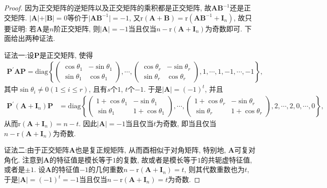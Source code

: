 \documentclass[../../main.tex]{subfiles}%
\begin{document}
\begin{proof}

因为正交矩阵的逆矩阵以及正交矩阵的乘积都是正交矩阵, 故\(\boldsymbol{AB}^{-1}\)还是正交矩阵. \(\vert\boldsymbol{A}\vert+\vert\boldsymbol{B}\vert = 0\)等价于\(\vert\boldsymbol{AB}^{-1}\vert = -1\), 又\(\mathrm{r}(\boldsymbol{A}+\boldsymbol{B})=\mathrm{r}(\boldsymbol{AB}^{-1}+\boldsymbol{I}_{n})\), 故只要证明: 若\(\boldsymbol{A}\)是\(n\)阶正交矩阵, 则\(\vert\boldsymbol{A}\vert = -1\)当且仅当\(n-\mathrm{r}(\boldsymbol{A}+\boldsymbol{I}_{n})\)为奇数即可. 下面给出两种证法.

{\color{blue}证法一:}设\(\boldsymbol{P}\)是正交矩阵, 使得
\begin{align*}
\boldsymbol{P}^{\prime}\boldsymbol{AP}=\mathrm{diag}\left\{\begin{pmatrix}\cos\theta_{1}&-\sin\theta_{1}\\\sin\theta_{1}&\cos\theta_{1}\end{pmatrix},\cdots,\begin{pmatrix}\cos\theta_{r}&-\sin\theta_{r}\\\sin\theta_{r}&\cos\theta_{r}\end{pmatrix},1,\cdots,1, -1,\cdots,-1\right\},
\end{align*}
其中\(\sin\theta_{i}\neq 0(1\leqslant  i\leqslant  r)\), 且有\(s\)个\(1\), \(t\)个\(-1\). 于是\(\vert\boldsymbol{A}\vert = (-1)^{t}\), 并且
\begin{align*}
\boldsymbol{P}^{\prime}(\boldsymbol{A}+\boldsymbol{I}_{n})\boldsymbol{P}&=\mathrm{diag}\left\{\begin{pmatrix}1 + \cos\theta_{1}&-\sin\theta_{1}\\\sin\theta_{1}&1 + \cos\theta_{1}\end{pmatrix},\cdots,\begin{pmatrix}1 + \cos\theta_{r}&-\sin\theta_{r}\\\sin\theta_{r}&1 + \cos\theta_{r}\end{pmatrix},2,\cdots,2,0,\cdots,0\right\},
\end{align*}
从而\(\mathrm{r}(\boldsymbol{A}+\boldsymbol{I}_{n}) = n - t\). 因此\(\vert\boldsymbol{A}\vert = -1\)当且仅当\(t\)为奇数, 即当且仅当\(n-\mathrm{r}(\boldsymbol{A}+\boldsymbol{I}_{n})\)为奇数.

{\color{blue}证法二:}由于正交矩阵\(\boldsymbol{A}\)也是复正规矩阵, 从而酉相似于对角矩阵, 特别地, \(\boldsymbol{A}\)可复对角化. 注意到\(\boldsymbol{A}\)的特征值是模长等于\(1\)的复数, 故或者是模长等于\(1\)的共轭虚特征值, 或者是\(\pm1\). 设\(\boldsymbol{A}\)的特征值\(-1\)的几何重数\(n-\mathrm{r}(\boldsymbol{A}+\boldsymbol{I}_{n}) = t\), 则其代数重数也为\(t\), 于是\(\vert\boldsymbol{A}\vert = (-1)^{t} = -1\)当且仅当\(n-\mathrm{r}(\boldsymbol{A}+\boldsymbol{I}_{n}) = t\)为奇数.

\end{proof}
\end{document}
